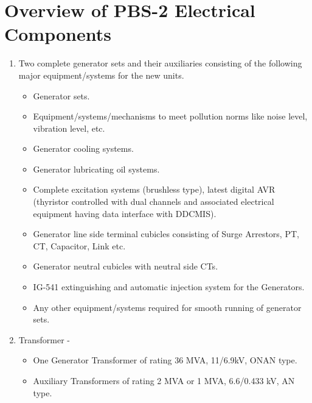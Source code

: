 \documentclass[english,11pt]{report}
\begin{document}
\section{Overview of PBS-2 Electrical Components}
\begin{enumerate}
\item 
Two complete generator sets and their auxiliaries consisting of the following major equipment/systems for the new units.
\begin{itemize}
    \item Generator sets.
    \item Equipment/systems/mechanisms to meet pollution norms like noise
  level, vibration level, etc.
    \item Generator cooling systems.
    \item Generator lubricating oil systems.
    \item Complete excitation systems (brushless type), latest digital AVR
  (thyristor controlled with dual channels and associated electrical
  equipment having data interface with DDCMIS).
    \item Generator line side terminal cubicles consisting of Surge Arrestors, PT,
  CT, Capacitor, Link etc.
    \item Generator neutral cubicles with neutral side CTs.
    \item IG-541 extinguishing and automatic injection system for the
  Generators.
    \item Any other equipment/systems required for smooth running of generator
  sets.
\end{itemize}

\item Transformer - \begin{itemize}
    \item One Generator Transformer of rating 36 MVA, 11/6.9kV, ONAN
        type.
    \item Auxiliary Transformers of rating 2 MVA or 1 MVA, 6.6/0.433 kV, AN
        type.
\end{itemize}


\end{enumerate}
\end{document}
